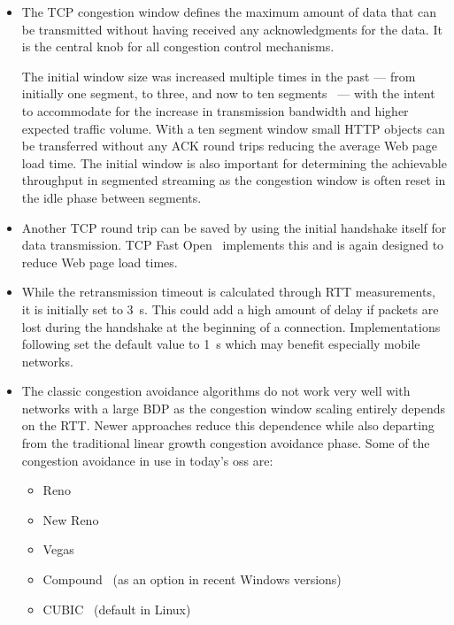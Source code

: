 \begin{itemize}
	\item The \gls{TCP} congestion window defines the maximum amount of data that can be transmitted without having received any acknowledgments for the data. It is the central knob for all congestion control mechanisms.

	The initial window size was increased multiple times in the past --- from initially one segment, to three, and now to ten segments~\cite{rfc6928} ---  with the intent to accommodate for the increase in transmission bandwidth and higher expected traffic volume. With a ten segment window small \gls{HTTP} objects can be transferred without any ACK round trips reducing the average Web page load time. The initial window is also important for determining the achievable throughput in segmented streaming as the congestion window is often reset in the idle phase between segments.

	\item Another \gls{TCP} round trip can be saved by using the initial handshake itself for data transmission. \gls{TCP} Fast Open~\cite{cheng2014tcptfo} implements this and is again designed to reduce Web page load times.

	\item While the retransmission timeout is calculated through \gls{RTT} measurements, it is initially set to \SI{3}{\second}. This could add a high amount of delay if packets are lost during the handshake at the beginning of a connection. Implementations following \cite{rfc6298} set the default value to \SI{1}{\second} which may benefit especially mobile networks.

	\item The classic congestion avoidance algorithms do not work very well with networks with a large \gls{BDP} as the congestion window scaling entirely depends on the \gls{RTT}. Newer approaches reduce this dependence while also departing from the traditional linear growth congestion avoidance phase. Some of the congestion avoidance in use in today's \glspl{os} are:

	\begin{itemize}
		\item Reno~\cite{rfc5681}
		\item New Reno~\cite{rfc6582}
		\item Vegas~\cite{Brakmo:1994:TVN:190809.190317}
		\item Compound~\cite{song2006compound} (as an option in recent Windows versions)
		\item CUBIC~\cite{ha2008cubic} (default in Linux)
	\end{itemize}
\end{itemize}


